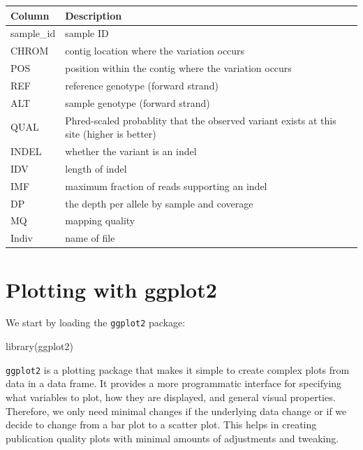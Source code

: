 \documentclass[
]{book}
\newenvironment{Shaded}{\begin{snugshade}}{\end{snugshade}}
\newcommand{\FunctionTok}[1]{\textcolor[rgb]{0.00,0.00,0.00}{#1}}
\newcommand{\NormalTok}[1]{#1}
\begin{document}
\begin{longtable}[]{@{}
  >{\raggedright\arraybackslash}p{}
  >{\raggedright\arraybackslash}p{}@{}}
\toprule
Column & Description \\
\midrule
\endhead
sample\_id & sample ID \\
CHROM & contig location where the variation occurs \\
POS & position within the contig where the variation occurs \\
REF & reference genotype (forward strand) \\
ALT & sample genotype (forward strand) \\
QUAL & Phred-scaled probablity that the observed variant exists at this site (higher is better) \\
INDEL & whether the variant is an indel \\
IDV & length of indel \\
IMF & maximum fraction of reads supporting an indel \\
DP & the depth per allele by sample and coverage \\
MQ & mapping quality \\
Indiv & name of file \\
\bottomrule
\end{longtable}

\hypertarget{plotting-with-ggplot2}{%
\section{Plotting with ggplot2}\label{plotting-with-ggplot2}}

We start by loading the \texttt{ggplot2} package:

\begin{Shaded}
\begin{Highlighting}[]
\FunctionTok{library}\NormalTok{(ggplot2)}
\end{Highlighting}
\end{Shaded}

\texttt{ggplot2} is a plotting package that makes it simple to create complex plots from data in a data frame. It provides a more programmatic interface for specifying what variables to plot, how they are displayed, and general visual properties. Therefore, we only need minimal changes if the underlying data change or if we decide to change from a bar plot to a scatter plot. This helps in creating publication quality plots with minimal amounts of adjustments and tweaking.
\end{document}
